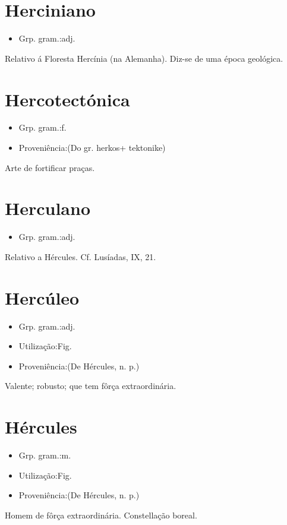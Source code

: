 \documentclass{article}
\begin{document}
\section{Herciniano}
\begin{itemize}
\item {Grp. gram.:adj.}
\end{itemize}
Relativo á Floresta Hercínia (na Alemanha).
Diz-se de uma época geológica.
\section{Hercotectónica}
\begin{itemize}
\item {Grp. gram.:f.}
\end{itemize}
\begin{itemize}
\item {Proveniência:(Do gr. \textunderscore herkos\textunderscore  + \textunderscore tektonike\textunderscore )}
\end{itemize}
Arte de fortificar praças.
\section{Herculano}
\begin{itemize}
\item {Grp. gram.:adj.}
\end{itemize}
Relativo a Hércules. Cf. \textunderscore Lusíadas\textunderscore , IX, 21.
\section{Hercúleo}
\begin{itemize}
\item {Grp. gram.:adj.}
\end{itemize}
\begin{itemize}
\item {Utilização:Fig.}
\end{itemize}
\begin{itemize}
\item {Proveniência:(De \textunderscore Hércules\textunderscore , n. p.)}
\end{itemize}
Valente; robusto; que tem fôrça extraordinária.
\section{Hércules}
\begin{itemize}
\item {Grp. gram.:m.}
\end{itemize}
\begin{itemize}
\item {Utilização:Fig.}
\end{itemize}
\begin{itemize}
\item {Proveniência:(De \textunderscore Hércules\textunderscore , n. p.)}
\end{itemize}
Homem de fôrça extraordinária.
Constellação boreal.
\end{document}
